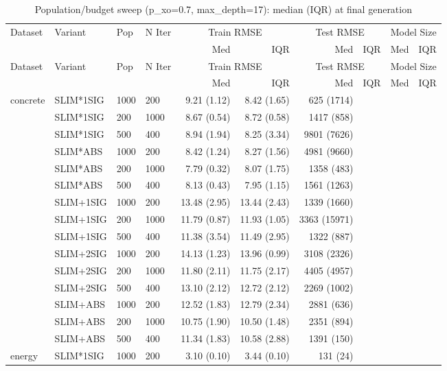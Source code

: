\begin{longtable}{llllrrrrrr}
\caption{Population/budget sweep (p\_xo=0.7, max\_depth=17): median (IQR) at final generation} \label{tab:pop_xo} \\
\toprule
Dataset & Variant & Pop & N Iter & \multicolumn{2}{c}{Train RMSE} & \multicolumn{2}{c}{Test RMSE} & \multicolumn{2}{c}{Model Size} \\
\cmidrule(lr){5-6}\cmidrule(lr){7-8}\cmidrule(lr){9-10}
 & &  &  & Med & IQR & Med & IQR & Med & IQR \\
\midrule
\endfirsthead
\toprule
Dataset & Variant & Pop & N Iter & \multicolumn{2}{c}{Train RMSE} & \multicolumn{2}{c}{Test RMSE} & \multicolumn{2}{c}{Model Size} \\
 & &  &  & Med & IQR & Med & IQR & Med & IQR \\
\midrule
\endhead
\bottomrule
\endfoot
concrete & SLIM*1SIG & 1000 & 200 & 9.21 (1.12) & 8.42 (1.65) & 625 (1714) \\
 & SLIM*1SIG & 200 & 1000 & 8.67 (0.54) & 8.72 (0.58) & 1417 (858) \\
 & SLIM*1SIG & 500 & 400 & 8.94 (1.94) & 8.25 (3.34) & 9801 (7626) \\
 & SLIM*ABS & 1000 & 200 & 8.42 (1.24) & 8.27 (1.56) & 4981 (9660) \\
 & SLIM*ABS & 200 & 1000 & 7.79 (0.32) & 8.07 (1.75) & 1358 (483) \\
 & SLIM*ABS & 500 & 400 & 8.13 (0.43) & 7.95 (1.15) & 1561 (1263) \\
 & SLIM+1SIG & 1000 & 200 & 13.48 (2.95) & 13.44 (2.43) & 1339 (1660) \\
 & SLIM+1SIG & 200 & 1000 & 11.79 (0.87) & 11.93 (1.05) & 3363 (15971) \\
 & SLIM+1SIG & 500 & 400 & 11.38 (3.54) & 11.49 (2.95) & 1322 (887) \\
 & SLIM+2SIG & 1000 & 200 & 14.13 (1.23) & 13.96 (0.99) & 3108 (2326) \\
 & SLIM+2SIG & 200 & 1000 & 11.80 (2.11) & 11.75 (2.17) & 4405 (4957) \\
 & SLIM+2SIG & 500 & 400 & 13.10 (2.12) & 12.72 (2.12) & 2269 (1002) \\
 & SLIM+ABS & 1000 & 200 & 12.52 (1.83) & 12.79 (2.34) & 2881 (636) \\
 & SLIM+ABS & 200 & 1000 & 10.75 (1.90) & 10.50 (1.48) & 2351 (894) \\
 & SLIM+ABS & 500 & 400 & 11.34 (1.83) & 10.58 (2.88) & 1391 (150) \\
\midrule
energy & SLIM*1SIG & 1000 & 200 & 3.10 (0.10) & 3.44 (0.10) & 131 (24) \\

\end{longtable}
